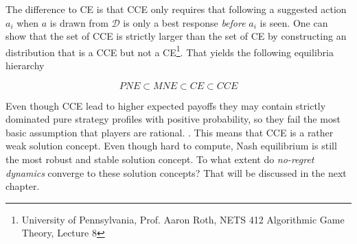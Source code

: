 The difference to CE is that CCE only requires that following a suggested action $a_i$ when $a$ is drawn from $\mathcal{D}$ is only a best response \textit{before} $a_i$ is seen. One can show that the set of CCE is strictly larger than the set of CE by constructing an distribution that is a CCE but not a CE\footnote{University of Pennsylvania, Prof. Aaron Roth, NETS 412 Algorithmic Game Theory, Lecture 8}. That yields the following equilibria hierarchy

\begin{equation*}
    PNE \subset MNE \subset CE \subset CCE
\end{equation*}

Even though CCE lead to higher expected payoffs they may contain strictly dominated pure strategy profiles with positive probability, so they fail the most basic assumption that players are rational. \cite{viossat}. This means that CCE is a rather weak solution concept. Even though hard to compute, Nash equilibrium is still the most robust and stable solution concept. To what extent do \textit{no-regret dynamics} converge to these solution concepts?  That will be discussed in the next chapter.


